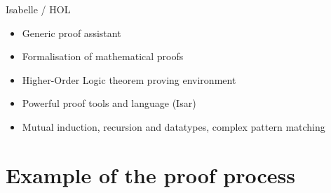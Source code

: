 \documentclass{beamer}
\theoremstyle{definition}
\begin{document}
\begin{frame}
\end{frame}

\begin{frame}
\vfill
{}
\end{frame}

\begin{frame}
  \begin{center}
    Isabelle / HOL
  \end{center}
  \begin{itemize}
    \item Generic proof assistant
    \vfill
    \item Formalisation of mathematical proofs
    \vfill
    \item Higher-Order Logic theorem proving environment
    \vfill
    \item Powerful proof tools and language (Isar) %
    \vfill
    \item Mutual induction, recursion and datatypes, complex pattern matching
  \end{itemize}
\end{frame}

\section[Example proof]{Example of the proof process}
\end{document}
